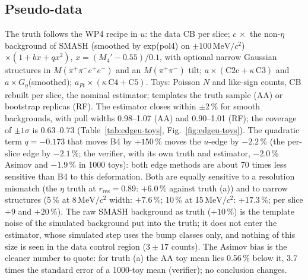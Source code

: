\documentclass[11pt,a4paper]{article}
\newcommand{\Mfour}{\ensuremath{M(\pi^{+}\pi^{-}e^{+}e^{-})}\xspace}
\newcommand{\Mpipi}{\ensuremath{M(\pi^{+}\pi^{-})}\xspace}
\newcommand{\GeVcc}{\ensuremath{\mathrm{GeV}/c^{2}}\xspace}
\newcommand{\MeVcc}{\ensuremath{\mathrm{MeV}/c^{2}}\xspace}
\newcommand{\code}[1]{\texttt{\detokenize{#1}}}
\newcommand{\Geta}{\ensuremath{G_\eta}\xspace}
\newcommand{\tabin}[1]{}
\begin{document}
\subsection{Pseudo-data}
\label{sec:edgeu-toys}
The truth follows the WP4 recipe in $u$: the data CB per slice; $c\,\times$ the non-$\eta$ background of SMASH (smoothed by exp(pol4) on
$\pm100$\,\MeVcc) $\times(1+bx+qx^2)$, $x=(M_4'-0.55)/0.1$, with optional narrow Gaussian structures in \Mfour and an \Mpipi tilt;
$a\times(\mathrm{C2c}+\kappa\,\mathrm{C3})$ and $a\times$\Geta (smoothed); $a_{Pt}\times(\kappa\,\mathrm{C4}+\mathrm{C5})$. Toys: Poisson $N$ and
like-sign counts, CB rebuilt per slice, the nominal estimator; templates the truth sample (AA) or bootstrap replicas (RF). The estimator closes
within $\pm2$\,\% for smooth backgrounds, with pull widths 0.98--1.07 (AA) and 0.90--1.01 (RF); the coverage of $\pm1\sigma$ is 0.63--0.73
(Table~\ref{tab:edgeu-toys}, Fig.~\ref{fig:edgeu-toys}). The quadratic term $q=-0.173$ that moves B4 by $+150$\,\% moves the $u$-edge by $-2.2$\,\%
(the per-slice edge by $-2.1$\,\%; the verifier, with its own truth and estimator, $-2.0$\,\% Asimov and $-1.9$\,\% in 1000 toys): both edge methods
are about 70 times less sensitive than B4 to this deformation. Both are equally sensitive to a resolution mismatch (the $\eta$ truth at
$r_{\mathrm{res}}=0.89$: $+6.0$\,\% against truth (a)) and to narrow structures (5\,\% at 8\,\MeVcc width: $+7.6$\,\%; 10\,\% at 15\,\MeVcc:
$+17.3$\,\%; per slice $+9$ and $+20$\,\%). The raw SMASH background as truth ($+10$\,\%) is the template noise of the simulated background put into
the truth; it does not enter the estimator, whose simulated step uses the bump classes only, and nothing of this size is seen in the data control
region ($3\pm17$ counts). The Asimov bias is the cleaner number to quote: for truth (a) the AA toy mean lies 0.56\,\% below it, 3.7 times the
standard error of a 1000-toy mean (verifier); no conclusion changes.

\begin{table}[!tbp]
\centering
\caption{\textbf{What it shows: the $u$-edge closes within about 2\,\% for smooth backgrounds; only a resolution mismatch (``mass''), the raw
template noise (``raw'') and narrow structures (``narrow'', ``wide'') bias it.} Pseudo-data, 1000 toys per truth. Truth (a): $c=1.35$, $b=-0.15$,
$a=0.42$; c1: $c=1$, no tilt; a1: $a=1$; q$-$, q$--$, q$+$: quadratic term $-0.173$ (B4 $+150$\,\%), $-0.346$, $+0.173$; om: $\omega/\rho^0$
$\times0.3$, rest $\times1.6$; ty: \Mpipi tilt; sA: stage-A background; sm3/5/6: smoother exp(pol3/5/6); raw: raw SMASH background; mass: $\eta$
truth at $s+0.0009$, $r_{\mathrm{res}}=0.89$; narrow / wide: 5\,\% Gaussian at 0.505 (8\,\MeVcc) / 10\,\% at 0.490\,\GeVcc (15\,\MeVcc) in \Mfour;
kap: $\kappa=0.48$; pk30 / pk55: true peak scale 0.30 / 0.55; datalike: $\kappa=0.48$, $c=1.16$. Source: \code{tables_all/edgeu_toys.txt}.}
\label{tab:edgeu-toys}
\footnotesize
\tabin{edgeu_toys.tex}
\end{table}
\end{document}
